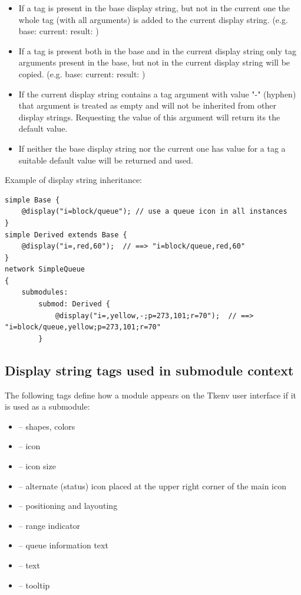 \begin{itemize}
  \item If a tag is present in the base display string, but not in the current one
        the whole tag (with all arguments) is added to the current display string.
        (e.g. base:  current:  result: )
  \item If a tag is present both in the base and in the current display string
        only tag arguments present in the base, but not in the current display string
        will be copied.
        (e.g. base:  current:  result: )
  \item If the current display string contains a tag argument with value "-" (hyphen)
        that argument is treated as empty and will not be inherited from other
        display strings. Requesting the value of this argument will return its the
        default value.
  \item If neither the base display string nor the current one has value for a tag
        a suitable default value will be returned and used.
\end{itemize}

Example of display string inheritance:
\begin{verbatim}
simple Base {
    @display("i=block/queue"); // use a queue icon in all instances
}
simple Derived extends Base {
    @display("i=,red,60");  // ==> "i=block/queue,red,60"
}
network SimpleQueue
{
    submodules:
        submod: Derived {
            @display("i=,yellow,-;p=273,101;r=70");  // ==> "i=block/queue,yellow;p=273,101;r=70"
        }
\end{verbatim}


\subsection{Display string tags used in submodule context}

The following tags define how a module appears on the Tkenv user interface
if it is used as a submodule:
\begin{itemize}
  \item{ -- shapes, colors}
  \item{ -- icon}
  \item{ -- icon size}
  \item{ -- alternate (status) icon placed at the upper right corner of the main icon}
  \item{ -- positioning and layouting}
  \item{ -- range indicator}
  \item{ -- queue information text}
  \item{ -- text}
  \item{ -- tooltip}
\end{itemize}

